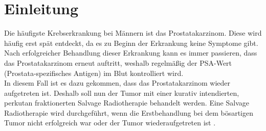 \section{Einleitung}
\label{sec:Einleitung}
Die häufigste Krebserkrankung bei Männern ist das Prostatakarzinom.
Diese wird häufig erst spät entdeckt, da es zu Beginn der Erkrankung keine Symptome gibt.
Nach erfolgreicher Behandlung dieser Erkrankung kann es immer passieren, dass das Prostatakarzinom
erneut auftritt, weshalb regelmäßig der PSA-Wert (Prostata-spezifisches Antigen) im Blut kontrolliert wird. \cite{Prostata} \\
In diesem Fall ist es dazu gekommen, dass das Prostatakarzinom wieder aufgetreten ist.
Deshalb soll nun der Tumor mit einer kurativ intendierten, perkutan fraktionerten Salvage Radiotherapie behandelt werden.
Eine Salvage Radiotherapie wird durchgeführt, wenn die Erstbehandlung bei dem bösartigen
Tumor nicht erfolgreich war oder der Tumor wiederaufgetreten ist \cite{Salvage}.
